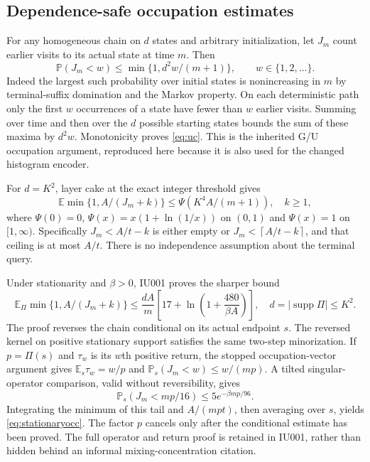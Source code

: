 \documentclass[11pt,letterpaper]{article}
\theoremstyle{definition}\newtheorem{definition}[theorem]{Definition}
\theoremstyle{remark}\newtheorem{remark}[theorem]{Remark}
\newcommand{\E}{\mathbb{E}}
\newcommand{\Prob}{\mathbb{P}}
\newcommand{\ceil}[1]{\left\lceil #1\right\rceil}
\newcommand{\supp}{\operatorname{supp}}
\newcommand{\unit}[1]{\textsf{#1}}
\begin{document}
\subsection{Dependence-safe occupation estimates}
For any homogeneous chain on $d$ states and arbitrary initialization, let $J_m$ count earlier visits to its actual state at time $m$. Then
\begin{equation}\label{eq:uc}
 \Prob(J_m<w)\le\min\{1,d^2w/(m+1)\},\qquad w\in\{1,2,\ldots\}.
\end{equation}
Indeed the largest such probability over initial states is nonincreasing in $m$ by terminal-suffix domination and the Markov property. On each deterministic path only the first $w$ occurrences of a state have fewer than $w$ earlier visits. Summing over time and then over the $d$ possible starting states bounds the sum of these maxima by $d^2w$. Monotonicity proves \eqref{eq:uc}. This is the inherited \unit{G/U} occupation argument, reproduced here because it is also used for the changed histogram encoder.

For $d=K^2$, layer cake at the exact integer threshold gives
\begin{equation}\label{eq:psi}
 \E\min\{1,A/(J_m+k)\}\le\Psi(K^4A/(m+1)),\quad k\ge1,
\end{equation}
where $\Psi(0)=0$, $\Psi(x)=x(1+\ln(1/x))$ on $(0,1)$ and $\Psi(x)=1$ on $[1,\infty)$. Specifically $J_m<A/t-k$ is either empty or $J_m<\ceil{A/t-k}$, and that ceiling is at most $A/t$. There is no independence assumption about the terminal query.

Under stationarity and $\beta>0$, \unit{IU001} proves the sharper bound
\begin{equation}\label{eq:stationaryocc}
 \E_\Pi\min\{1,A/(J_m+k)\}
 \le\frac{dA}{m}\left[17+\ln\left(1+\frac{480}{\beta A}\right)\right],
 \quad d=|\supp\Pi|\le K^2.
\end{equation}
The proof reverses the chain conditional on its actual endpoint $s$. The reversed kernel on positive stationary support satisfies the same two-step minorization. If $p=\Pi(s)$ and $\tau_w$ is its $w$th positive return, the stopped occupation-vector argument gives $\E_s\tau_w=w/p$ and $\Prob_s(J_m<w)\le w/(mp)$. A tilted singular-operator comparison, valid without reversibility, gives
\[
 \Prob_s(J_m<mp/16)\le5e^{-\beta mp/96}.
\]
Integrating the minimum of this tail and $A/(mpt)$, then averaging over $s$, yields \eqref{eq:stationaryocc}. The factor $p$ cancels only after the conditional estimate has been proved. The full operator and return proof is retained in \unit{IU001}, rather than hidden behind an informal mixing-concentration citation.
\end{document}
